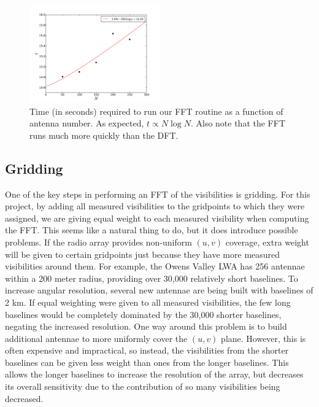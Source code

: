\documentclass[11pt,letterpaper]{article}
\begin{document}
\begin{figure}[!h]
\centering
\includegraphics[width=0.5\textwidth]{FFT_image_timing.pdf}
\caption{Time (in seconds) required to run our FFT routine as a function of 
antenna number.  As expected, $t\propto N\log N$.  Also note that the FFT 
runs much more quickly than the DFT.}
\label{fig:FFTtime}
\end{figure}

\subsection{Gridding}
One of the key steps in performing an FFT of the visibilities is gridding.  
For this project, by adding all measured visibilities to the gridpoints 
to which they were assigned, we are giving equal weight to each 
measured visibility when computing the FFT.  This seems like a natural 
thing to do, but it does introduce possible problems.  If the radio array 
provides non-uniform $(u,v)$ coverage, extra weight will be given to 
certain gridpoints just because they have more measured 
visibilities around them.  For example, the Owens Valley LWA 
has 256 antennae within a 200 meter radius, providing over 
30,000 relatively short baselines.  To increase angular 
resolution, several new antennae are being built with baselines 
of 2 km.  If equal weighting were given to all measured visibilities, 
the few long baselines would be completely dominated by the 30,000 
shorter baselines, negating the increased resolution.  One way around 
this problem is to build additional antennae to more uniformly cover the 
$(u,v)$ plane.  However, this is often expensive and impractical, so instead, 
the visibilities from the shorter baselines can be given less weight than 
ones from the longer baselines.  This allows the longer baselines to 
increase the resolution of the array, but decreases its overall 
sensitivity due to the contribution of so many visibilities being decreased.
\end{document}
